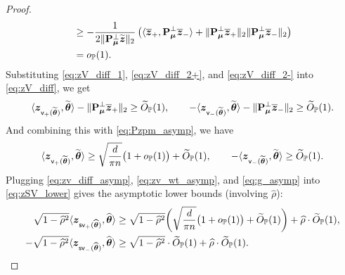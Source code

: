 \begin{proof}
\begin{equation}
\begin{aligned}
        & \ge - \frac{1}{2\| \mathrm{\bf P}_{{\boldsymbol{\mu}}}^\perp \widetilde{\text{\boldmath $z$}} \|_2} \left( 
            \langle \overline{\text{\boldmath $z$}}_+, \mathrm{\bf P}_{{\boldsymbol{\mu}}}^\perp \overline{\text{\boldmath $z$}}_-  \rangle + \| \mathrm{\bf P}_{{\boldsymbol{\mu}}}^\perp \overline{\text{\boldmath $z$}}_+ \|_2 \| \mathrm{\bf P}_{{\boldsymbol{\mu}}}^\perp \overline{\text{\boldmath $z$}}_- \|_2
         \right) \\
        & = o_{\mathbb{P}}(1).
    \end{aligned}
\end{equation}
Substituting \cref{eq:zV_diff_1}, \eqref{eq:zV_diff_2+}, and \eqref{eq:zV_diff_2-} into \cref{eq:zV_diff}, we get
\begin{equation}
    \label{eq:zv_diff_asymp}
    \< \zz_{\mathsf{v}_+(\wt\vtheta)}, \wt\vtheta \> - \| \bP_{\vmu}^\perp \bar\zz_+ \|_2
    \ge \wt O_\P(1),
    \qquad
    - \< \zz_{\mathsf{v}_-(\wt\vtheta)}, \wt\vtheta \> - \| \bP_{\vmu}^\perp \bar\zz_- \|_2
    \ge \wt O_\P(1).
\end{equation}
And combining this with \cref{eq:Pzpm_asymp}, we have
\begin{equation}
    \label{eq:zv_wt_asymp}
    \< \zz_{\mathsf{v}_+(\wt\vtheta)}, \wt\vtheta \> 
    \ge \sqrt{\frac{d}{\pi n}}\big(1 + o_\P(1) \big) + \wt O_\P(1),
    \qquad
    - \< \zz_{\mathsf{v}_-(\wt\vtheta)}, \wt\vtheta \> 
    \ge \wt O_\P(1).
\end{equation}
Plugging \cref{eq:zv_diff_asymp}, \eqref{eq:zv_wt_asymp}, and \eqref{eq:g_asymp} into \cref{eq:zSV_lower} gives the asymptotic lower bounds (involving $\hat\rho$):
\begin{equation}
    \label{eq:zSV_lower_asymp}
    \begin{aligned}
        \phantom{-} \sqrt{1 - \hat\rho^2} \< \zz_{\mathsf{sv}_+(\hat\vtheta)}, \hat\vtheta \>  
        & \ge  \sqrt{1 - \hat\rho^2} \biggl( \sqrt{\frac{d}{\pi n}}\big(1 + o_\P(1) \big) 
        + \wt O_\P(1)
        \biggr)
        + 
        \hat\rho \cdot \wt O_\P(1) , \\
        - \sqrt{1 - \hat\rho^2} \< \zz_{\mathsf{sv}_-(\hat\vtheta)}, \hat\vtheta \> 
        & \ge  \sqrt{1 - \hat\rho^2} \cdot \wt O_\P(1) + 
        \hat\rho \cdot \wt O_\P(1) .
    \end{aligned}
\end{equation}



\end{proof}

